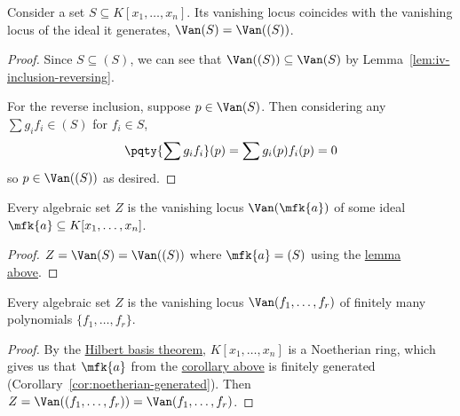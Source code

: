 \begin{lemma}\label{lem:vanishing-locus-ideal}
    Consider a set \(S \subseteq K[x_1,\hdots,x_n]\).
    Its vanishing locus coincides with the vanishing locus of the ideal it generates,
    \(\Van(S) = \Van((S))\).
\end{lemma}
\begin{proof}
    Since \(S \subseteq (S)\),
    we can see that \(\Van((S)) \subseteq \Van(S)\)
    by Lemma~\ref{lem:iv-inclusion-reversing}.

    For the reverse inclusion, suppose \(p \in \Van(S)\).
    Then considering any \(\sum g_i f_i \in (S)\) for \(f_i \in S\),
    \begin{equation*}
        \pqty{\sum g_i f_i}(p) = \sum g_i(p) f_i(p) = 0
    \end{equation*}
    so \(p \in \Van((S))\) as desired.
\end{proof}
\begin{corollary}\label{cor:vanishing-locus-ideal}
    Every algebraic set \(Z\) is the vanishing locus \(\Van(\mfk{a})\)
    of some ideal \(\mfk{a} \subseteq K[x_1,\hdots,x_n]\).
\end{corollary}
\begin{proof}
    \(Z = \Van(S) = \Van((S))\) where \(\mfk{a} = (S)\)
    using the \hyperref[lem:vanishing-locus-ideal]{lemma above}.
\end{proof}
\begin{proposition}
    Every algebraic set \(Z\) is the vanishing locus \(\Van(f_1,\hdots,f_r)\)
    of finitely many polynomials \(\{f_1,\hdots,f_r\}\).
\end{proposition}
\begin{proof}
    By the \hyperref[cor:hilbert-basis]{Hilbert basis theorem},
    \(K[x_1,\hdots,x_n]\) is a Noetherian ring,
    which gives us that \(\mfk{a}\) from the \hyperref[cor:vanishing-locus-ideal]{corollary above}
    is finitely generated (Corollary~\ref{cor:noetherian-generated}).
    Then \(Z = \Van((f_1,\hdots,f_r)) = \Van(f_1,\hdots,f_r)\).
\end{proof}

